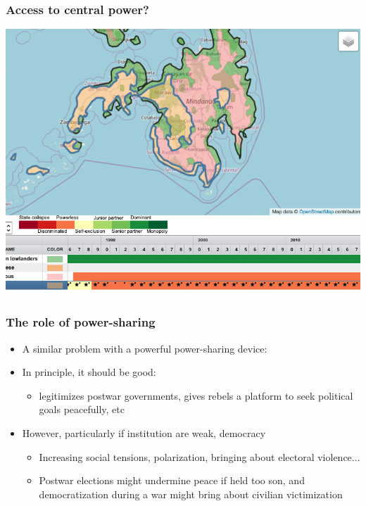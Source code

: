 \documentclass[aspectratio=43]{beamer}
\begin{document}
\begin{frame}
\frametitle{Access to central power?}
\centering

\includegraphics[width = \textwidth]{img/moro_epr}

\end{frame}

\begin{frame}
\frametitle{The role of power-sharing}
\centering

\begin{itemize}[<+->]
  \item A similar problem with a powerful power-sharing device: 
  \item In principle, it should be good:
  \begin{itemize}
    \item legitimizes postwar governments, gives rebels a platform to seek political goals peacefully, etc
  \end{itemize}
  \item However, particularly if institution are weak, democracy 
  \begin{itemize}
    \item Increasing social tensions, polarization, bringing about electoral violence...
    \item Postwar elections might undermine peace if held too son, and democratization during a war might bring about civilian victimization
  \end{itemize}
\end{itemize}

\end{frame}
\end{document}
